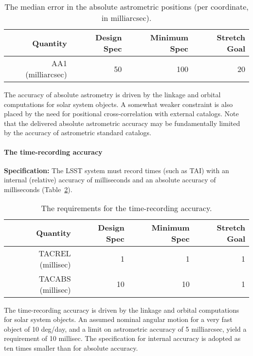 \begin{table}[h]
\begin{tabular}{|r|r|r|r|}
\hline
Quantity            & Design Spec & Minimum Spec & Stretch Goal     \\
\hline
  AA1 (milliarcsec)  &    50      &      100    &       20         \\
\hline
\end{tabular}
\caption{The median error in the absolute astrometric positions (per
coordinate, in milliarcsec).}
\label{TastroAbs}
\end{table}

The accuracy of absolute astrometry is driven by the linkage and orbital
computations for solar system objects. A somewhat weaker constraint is also
placed by the need for positional cross-correlation with external
catalogs. Note that the delivered absolute astrometric accuracy may be
fundamentally limited by the accuracy of astrometric standard catalogs.



\paragraph{The time-recording accuracy\\}

\textbf{Specification:}
The LSST system must record times (such as TAI)
with an internal (relative) accuracy of
milliseconds and an absolute accuracy of
milliseconds (Table~\ref{TtimeRec}).

\begin{table}[h]
\begin{tabular}{|r|r|r|r|}
\hline
Quantity             & Design Spec & Minimum Spec & Stretch Goal     \\
\hline
 TACREL (millisec)   &     1  &    1   &    1 \\
 TACABS (millisec)   &    10  &   10   &    1 \\
\hline
\end{tabular}
\caption{The requirements for the time-recording accuracy.}
\label{TtimeRec}
\end{table}

The time-recording accuracy is driven by the linkage and
orbital computations for solar system objects. An assumed
nominal angular motion for a very fast object of 10 deg/day,
and a limit on astrometric accuracy of 5 milliarcsec, yield
a requirement of 10 millisec. The specification for internal
accuracy is adopted as ten times smaller than for absolute
accuracy.





